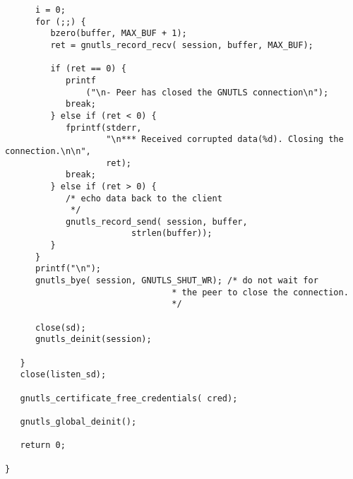 \begin{verbatim}
      i = 0;
      for (;;) {
         bzero(buffer, MAX_BUF + 1);
         ret = gnutls_record_recv( session, buffer, MAX_BUF);

         if (ret == 0) {
            printf
                ("\n- Peer has closed the GNUTLS connection\n");
            break;
         } else if (ret < 0) {
            fprintf(stderr,
                    "\n*** Received corrupted data(%d). Closing the connection.\n\n",
                    ret);
            break;
         } else if (ret > 0) {
            /* echo data back to the client
             */
            gnutls_record_send( session, buffer,
                         strlen(buffer));
         }
      }
      printf("\n");
      gnutls_bye( session, GNUTLS_SHUT_WR); /* do not wait for
                                 * the peer to close the connection.
                                 */

      close(sd);
      gnutls_deinit(session);

   }
   close(listen_sd);

   gnutls_certificate_free_credentials( cred);

   gnutls_global_deinit();

   return 0;

}

\end{verbatim}
